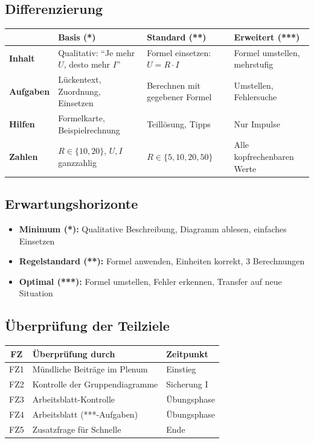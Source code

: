 \documentclass[11pt,a4paper]{article}
\begin{document}
\subsection{Differenzierung}
\begin{tabular}{|l|p{3.5cm}|p{3.5cm}|p{3.5cm}|}
\hline
& \textbf{Basis (*)} & \textbf{Standard (**)} & \textbf{Erweitert (***)} \\
\hline
\textbf{Inhalt} & Qualitativ: ``Je mehr $U$, desto mehr $I$'' & Formel einsetzen: $U = R \cdot I$ & Formel umstellen, mehrstufig \\
\hline
\textbf{Aufgaben} & Lückentext, Zuordnung, Einsetzen & Berechnen mit gegebener Formel & Umstellen, Fehlersuche \\
\hline
\textbf{Hilfen} & Formelkarte, Beispielrechnung & Teillösung, Tipps & Nur Impulse \\
\hline
\textbf{Zahlen} & $R \in \{10, 20\}$, $U, I$ ganzzahlig & $R \in \{5, 10, 20, 50\}$ & Alle kopfrechenbaren Werte \\
\hline
\end{tabular}

\subsection{Erwartungshorizonte}
\begin{itemize}
    \item \textbf{Minimum (*):} Qualitative Beschreibung, Diagramm ablesen, einfaches Einsetzen
    \item \textbf{Regelstandard (**):} Formel anwenden, Einheiten korrekt, 3 Berechnungen
    \item \textbf{Optimal (***):} Formel umstellen, Fehler erkennen, Transfer auf neue Situation
\end{itemize}

\subsection{Überprüfung der Teilziele}
\begin{tabular}{|c|l|l|}
\hline
\textbf{FZ} & \textbf{Überprüfung durch} & \textbf{Zeitpunkt} \\
\hline
FZ1 & Mündliche Beiträge im Plenum & Einstieg \\
\hline
FZ2 & Kontrolle der Gruppendiagramme & Sicherung I \\
\hline
FZ3 & Arbeitsblatt-Kontrolle & Übungsphase \\
\hline
FZ4 & Arbeitsblatt (***-Aufgaben) & Übungsphase \\
\hline
FZ5 & Zusatzfrage für Schnelle & Ende \\
\hline
\end{tabular}
\end{document}
